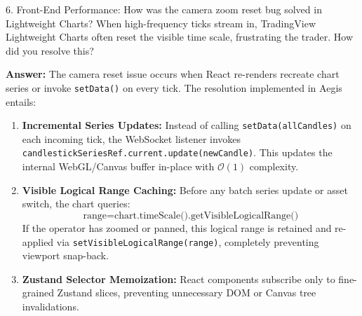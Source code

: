 \documentclass[11pt,a4paper]{article}
\begin{document}
\begin{questionbox}{6. Front-End Performance: How was the camera zoom reset bug solved in Lightweight Charts?}
When high-frequency ticks stream in, TradingView Lightweight Charts often reset the visible time scale, frustrating the trader. How did you resolve this?
\end{questionbox}
\begin{answerbox}
\textbf{Answer:} The camera reset issue occurs when React re-renders recreate chart series or invoke \texttt{setData()} on every tick. The resolution implemented in Aegis entails:
\begin{enumerate}[leftmargin=1.5em]
  \item \textbf{Incremental Series Updates:} Instead of calling \texttt{setData(allCandles)} on each incoming tick, the WebSocket listener invokes \texttt{candlestickSeriesRef.current.update(newCandle)}. This updates the internal WebGL/Canvas buffer in-place with $\mathcal{O}(1)$ complexity.
  \item \textbf{Visible Logical Range Caching:} Before any batch series update or asset switch, the chart queries:
  $$\text{range} = \text{chart.timeScale().getVisibleLogicalRange()}$$
  If the operator has zoomed or panned, this logical range is retained and re-applied via \texttt{setVisibleLogicalRange(range)}, completely preventing viewport snap-back.
  \item \textbf{Zustand Selector Memoization:} React components subscribe only to fine-grained Zustand slices, preventing unnecessary DOM or Canvas tree invalidations.
\end{enumerate}
\end{answerbox}

\vspace{0.4em}
\end{document}
